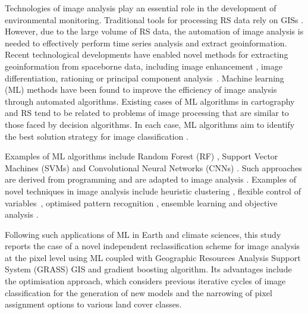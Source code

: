 \documentclass[jimaging,article,accept,pdftex,moreauthors]{Definitions/mdpi}
\begin{document}
Technologies {of} {image analysis} play an essential role in the development {of environmental monitoring}. {Traditional tools for processing RS data rely on} {GISs} \cite{BORANA2023261,Zhu02012021}. However, {due to the large volume of RS data, the automation of image analysis is needed to effectively perform time series analysis and extract geoinformation}. {Recent {technological} %
developments have enabled novel methods for extracting geoinformation from spaceborne data, including} image enhancement \cite{Dyson2024}, image differentiation, rationing or principal component \mbox{analysis \cite{7877513}}. Machine learning (ML) methods have been found to improve the efficiency of {image analysis} through automated algorithms. Existing cases of ML algorithms in cartography and RS tend to be {related} to problems of image processing that are similar to those faced by decision algorithms{. }In each case, ML algorithms {aim to identify} {the best} solution strategy for image classification \cite{FERCHICHI2024122211}.

{Examples of} ML algorithms include{ }Random Forest (RF) \cite{Balha2022,Lemenkova202401}, {Support Vector Machines (SVMs)} \cite{10450641} and {Convolutional Neural Networks (CNNs)} \cite{SUAREZFERNANDEZ2024}. Such approaches are derived from programming and are adapted to{ }image analysis{ }\cite{HUANG2020104580,Arabameri}. Examples of {novel} techniques {in image analysis} include heuristic clustering \cite{8524429,10615674,669164,4666175}, flexible control of \mbox{variables \cite{8999627}}, optimised pattern recognition \cite{9708387,1634653}, ensemble learning \cite{10145147} and objective analysis \cite{8938484,9279780}. 

{Following such applications of ML in Earth and climate sciences, }this study {reports the case of a novel independent reclassification scheme for image analysis at the pixel level using} ML {coupled with} %
Geographic Resources Analysis Support System (GRASS) GIS and gradient boosting algorithm. {Its advantages include the optimisation approach, which} considers previous iterative cycles of image classification for the generation of {new} %
models and the narrowing of pixel assignment options to various land cover classes. 
\end{document}
